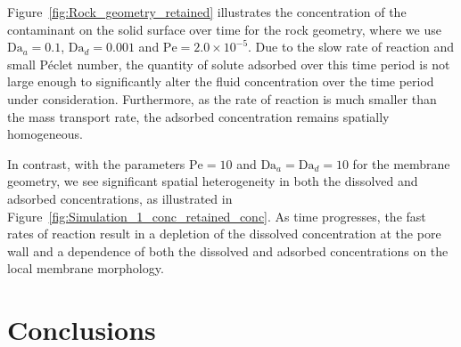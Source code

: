\documentclass[preprint, 1p, authoryear]{elsarticle}
\begin{document}
Figure~\ref{fig:Rock_geometry_retained} illustrates the concentration of the contaminant on the solid surface over time for the rock geometry,  where we use $\mathrm{Da}_{a}  = 0.1$,  $\mathrm{Da}_{d}=   0.001$ and $\mathrm{Pe} = 2.0 \times 10^{-5}$. Due to the slow rate of reaction and small P\'eclet number, the quantity of solute adsorbed over this time period is not large enough to significantly alter the fluid concentration over the time period under consideration.  Furthermore, as the rate of reaction is much smaller than the mass transport rate, the adsorbed concentration remains spatially homogeneous. 

In contrast, with  the parameters $\mathrm{Pe} = 10$ and $ \mathrm{Da}_a = \mathrm{Da}_d = 10$ for the membrane geometry, we see significant spatial heterogeneity in both the dissolved and adsorbed concentrations, as illustrated in Figure~\ref{fig:Simulation_1_conc_retained_conc}.  As time progresses, the fast rates of reaction result in a depletion of the dissolved  concentration at the pore wall and a  dependence of both the dissolved and adsorbed concentrations on the local membrane morphology.  







\section{Conclusions}
\label{sec:Conclusion_Discussion}
\end{document}
